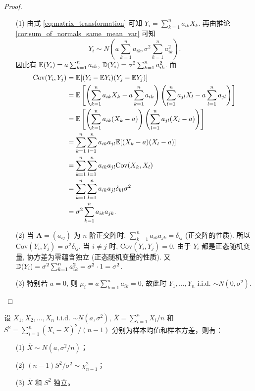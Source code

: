 \begin{proof}
\begin{itemize}
    \item [(1)] 由式 \eqref{eq:matrix_transformation} 可知 $Y_i = \sum_{k=1}^n a_{ik}X_k$. 再由推论 \ref{cor:sum_of_normals_same_mean_var} 可知
\[
Y_i \sim N\left(a \sum_{k=1}^n a_{ik}, \sigma^2 \sum_{k=1}^n a_{ik}^2\right).
\]
因此有 $\mathbb{E}(Y_i) = a \sum_{k=1}^n a_{ik}$, $\mathbb{D}(Y_i) = \sigma^2 \sum_{k=1}^n a_{ik}^2$. 而
\begin{align*}
\text{Cov}(Y_i, Y_j) &= \mathbb{E}[(Y_i - \mathbb{E} Y_i)(Y_j - \mathbb{E} Y_j)] \\
&= \mathbb{E}\left[\left(\sum_{k=1}^n a_{ik}X_k - a\sum_{k=1}^n a_{ik}\right)\left(\sum_{l=1}^n a_{jl}X_l - a\sum_{l=1}^n a_{jl}\right)\right] \\
&= \mathbb{E}\left[\left(\sum_{k=1}^n a_{ik}(X_k - a)\right)\left(\sum_{l=1}^n a_{jl}(X_l - a)\right)\right] \\
&= \sum_{k=1}^n \sum_{l=1}^n a_{ik}a_{jl} \mathbb{E}[(X_k - a)(X_l - a)] \\
&= \sum_{k=1}^n \sum_{l=1}^n a_{ik}a_{jl} \text{Cov}(X_k, X_l) \\
&= \sum_{k=1}^n \sum_{l=1}^n a_{ik}a_{jl} \delta_{kl}\sigma^2 \\
&= \sigma^2 \sum_{k=1}^n a_{ik}a_{jk}.
\end{align*}
    \item [(2)] 当 $\boldsymbol{A} = (a_{ij})$ 为 $n$ 阶正交阵时, $\sum_{k=1}^n a_{ik}a_{jk} = \delta_{ij}$ (正交阵的性质).
所以 $\text{Cov}(Y_i, Y_j) = \sigma^2 \delta_{ij}$.
当 $i \ne j$ 时, $\text{Cov}(Y_i, Y_j) = 0$. 由于 $Y_i$ 都是正态随机变量, 协方差为零蕴含独立 (正态随机变量的性质).
又 $\mathbb{D}(Y_i) = \sigma^2 \sum_{k=1}^n a_{ik}^2 = \sigma^2 \cdot 1 = \sigma^2$.
    \item [(3)] 特别若 $a=0$, 则 $\mu_i = a \sum_{k=1}^n a_{ik} = 0$, 故此时 $Y_1, \ldots, Y_n$ i.i.d. $\sim N(0, \sigma^2)$.
\end{itemize}
\end{proof}

\begin{lemma} \label{lem:fisher}
设 $X_1, X_2, \ldots, X_n$ i.i.d. $\sim N(a, \sigma^2)$, $\overline{X} = \sum_{i=1}^n X_i/n$ 和 $S^2 = \sum_{i=1}^n (X_i - \overline{X})^2/(n-1)$ 分别为样本均值和样本方差，则有：
\begin{enumerate}
    \item[(1)] $\overline{X} \sim N(a, \sigma^2/n)$；
    \item[(2)] $(n-1)S^2/\sigma^2 \sim \chi_{n-1}^2$；
    \item[(3)] $\overline{X}$ 和 $S^2$ 独立。
\end{enumerate}
\end{lemma}

